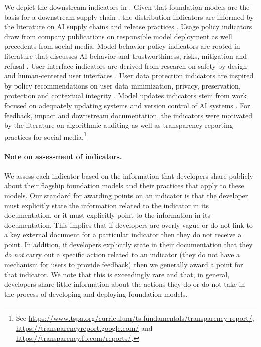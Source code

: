 \documentclass[screen, authorversion, acmsmall]{acmart}
\begin{document}
\noindent We depict the downstream indicators in .
Given that foundation models are the basis for a downstream supply chain \citep{bommasani2021opportunities}, the distribution indicators are informed by the literature on AI supply chains \citep{bommasani2023ecosystem, vipra2023concentration, cen2023supplychain, cobbe2023supply, widder2023thinking, brown2023allocating} and release practices \citep{liang2022thetime, solaiman2023gradient, henderson2023foundation, pmlr-v202-kirchenbauer23a, Kuditipudi2023RobustDW, liesenfeld2023opening}. 
Usage policy indicators draw from company publications on responsible model deployment \cite{cohere2022} as well precedents from social media. 
Model behavior policy indicators are rooted in literature that discusses AI behavior and trustworthiness, risks, mitigation and refusal \cite{kumar2022language, weidinger2021ethical, brundage2020toward, cammarota2020trustworthy, kumar2020trustworthy, liu2022trustworthy, reuter2023im}. 
User interface indicators are derived from research on safety by design and human-centered user interfaces \cite{qiaosi2023ux, nakao2022responsible}. 
User data protection indicators are inspired by policy recommendations on user data minimization, privacy, preservation, protection and contextual integrity \cite{eu2016, brown2022does,vipra2023, winograd2023privacy, nissenbaum2004contextual, king2020privacy, mulligan2017privacy}.
Model updates indicators stem from work focused on adequately updating systems and version control of AI systems \citep{sathyavageesran2022privacy, hashesh2023version, chen2023chatgpts}. 
For feedback, impact and downstream documentation, the indicators were motivated by the literature on algorithmic auditing \cite{liang2022thetime, solaiman2023gradient, raji2022audit} as well as transparency reporting practices for social media.\footnote{See \url{https://www.tspa.org/curriculum/ts-fundamentals/transparency-report/}, \url{https://transparencyreport.google.com/} and \url{https://transparency.fb.com/reports/}.}

\paragraph{Note on assessment of indicators.}
We assess each indicator based on the information that developers share publicly about their flagship foundation models and their practices that apply to these models. 
Our standard for awarding points on an indicator is that the developer must explicitly state the information related to the indicator in its documentation, or it must explicitly point to the information in its documentation.
This implies that if developers are overly vague or do not link to a key external document for a particular indicator then they do not receive a point.
In addition, if developers explicitly state in their documentation that they \emph{do not} carry out a specific action related to an indicator (\eg they do not have a mechanism for users to provide feedback) then we generally award a point for that indicator.
We note that this is exceedingly rare and that, in general, developers share little information about the actions they do or do not take in the process of developing and deploying foundation models.
\end{document}
